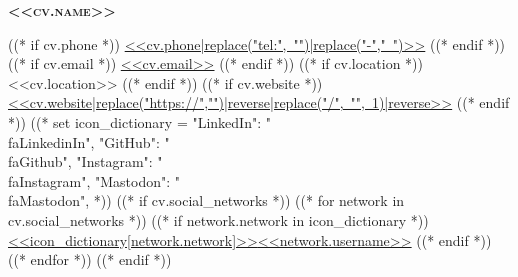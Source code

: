 \begin{center}
    \textbf{\Huge \scshape <<cv.name>>} \\ \vspace{3pt}
    \small

    ((* if cv.phone *))
    \mbox{\href{<<cv.phone|replace("-","")>>}{{\footnotesize\faPhone*}\hspace{4pt}<<cv.phone|replace("tel:", "")|replace("-"," ")>>}}
    \hspace{<<design.space_between_connection_objects>>}
    ((* endif *))
    ((* if cv.email *))
    \mbox{\href{mailto:<<cv.email>>}{{\small\faEnvelope[regular]}\hspace{4pt}<<cv.email>>}}
    \hspace{<<design.space_between_connection_objects>>}
    ((* endif *))
    ((* if cv.location *))
    \mbox{{\small\faMapMarker*}\hspace{4pt}<<cv.location>>}
    \hspace{<<design.space_between_connection_objects>>}
    ((* endif *))
    ((* if cv.website *))
    \mbox{\href{<<cv.website>>}{{\small\faLink}\hspace{4pt}<<cv.website|replace("https://","")|reverse|replace("/", "", 1)|reverse>>}}
    \hspace{<<design.space_between_connection_objects>>}
    ((* endif *))
    ((*
        set icon_dictionary = {
            "LinkedIn": "\\faLinkedinIn",
            "GitHub": "\\faGithub",
            "Instagram": "\\faInstagram",
            "Mastodon": "\\faMastodon",
        }
    *))
    ((* if cv.social_networks *))
        ((* for network in cv.social_networks *))
            ((* if network.network in icon_dictionary *))
    \mbox{\href{<<network.url>>}{{\small<<icon_dictionary[network.network]>>}\hspace{4pt}<<network.username>>}}
    \hspace{<<design.space_between_connection_objects>>}
            ((* endif *))
        ((* endfor *))
    ((* endif *))
\end{center}

\let\hrefWithoutArrow\href
\renewcommand{\href}[2]{\hrefWithoutArrow{#1}{\mbox{#2 \raisebox{.15ex}{\footnotesize \faExternalLink*}}}}